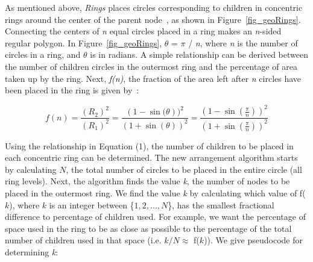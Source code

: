 \documentclass[]{article}
\begin{document}
{As mentioned above, {\em Rings} places circles corresponding to children in concentric rings around the center of the parent node~\cite{tm02}, as shown in Figure~\ref{fig_geoRings}.
Connecting the centers of {\em n} equal circles placed in a ring makes an {\em n}-sided regular polygon.
In Figure~\ref{fig_geoRings}, $\theta$ = $\pi$ / {\em n}, where {\em n} is the number of circles in a ring, and $\theta$ is in radians.
A simple relationship can be derived between the number of children circles in the outermost ring and the percentage of area taken up by the ring.
Next, {\em f(n)}, the fraction of the area left after {\em n} circles have been placed in the ring is given by~\cite{tm02}:

\begin{equation}
f(n) = \frac{(R_{2})^{2}}{(R_{1})^{2}} = \frac{(1-\sin{(\theta}))^{2}}{(1+\sin{(\theta)})^{2}} = \frac{(1-\sin{(\frac{\pi}{n})})^{2}}{(1+\sin{(\frac{\pi}{n})})^{2}}
\end{equation}
\label{rings_eq}

Using the relationship in Equation (1), the number of children to be placed in each concentric ring can be determined.
The new arrangement algorithm starts by calculating $N$, the total number of circles to be placed in the entire circle (all ring levels).
Next, the algorithm finds the value {\em k}, the number of nodes to be placed in the outermost ring.  
We find the value {\em k} by calculating which value of f($k$), where $k$ is an integer between \{$1,2,...,N$\}, has the smallest fractional difference to percentage of children used.
For example, we want the percentage of space used in the ring to be as close as possible to the percentage of the total number of children used in that space (i.e. $k/N \approx$ f($k$)).
We give pseudocode for determining {\em k}:

}
\end{document}
